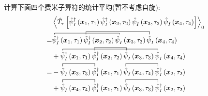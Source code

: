 \begin{example}计算下面四个费米子算符的统计平均(暂不考虑自旋):
\begin{align}
& \left\langle\hat{T}_\tau\left[\hat{\psi}_I^{\dagger}\left(\vct{x}_1, \tau_1\right) \hat{\psi}_I^{\dagger}\left(\vct{x}_2, \tau_2\right) \hat{\psi}^{}_I\left(\vct{x}_3, \tau_3\right) \hat{\psi}^{}_I\left(\vct{x}_4, \tau_4\right)\right]\right\rangle_0 \nonumber\\
= &
\contraction[0.5ex]{}{\hat{\psi}}{_I^{\dagger}\left(\vct{x}_1, \tau_1\right) \hat{\psi}_I^{\dagger}\left(\vct{x}_2, \tau_2\right)}{\hat{\psi}_I}
\contraction[1ex]{\hat{\psi}_I^{\dagger}\left(\vct{x}_1, \tau_1\right)}{\hat{\psi}}{_I^{\dagger}\left(\vct{x}_2, \tau_2\right) \hat{\psi}^{}_I\left(\vct{x}_3, \tau_3\right)}{\hat{\psi}}
\hat{\psi}_I^{\dagger}\left(\vct{x}_1, \tau_1\right) \hat{\psi}_I^{\dagger}\left(\vct{x}_2, \tau_2\right) \hat{\psi}^{}_I\left(\vct{x}_3, \tau_3\right) \hat{\psi}^{}_I\left(\vct{x}_4, \tau_4\right)\nonumber\\
&+
\contraction[0.5ex]{}{\hat{\psi}}{_I^{\dagger}\left(\vct{x}_1, \tau_1\right) \hat{\psi}_I^{\dagger}\left(\vct{x}_2, \tau_2\right) \hat{\psi}^{}_I\left(\vct{x}_3, \tau_3\right)}{\hat{\psi}}
\contraction[1ex]{\hat{\psi}_I^{\dagger}\left(\vct{x}_1, \tau_1\right) }{\hat{\psi}}{_I^{\dagger}\left(\vct{x}_2, \tau_2\right)}{\hat{\psi}}
\hat{\psi}_I^{\dagger}\left(\vct{x}_1, \tau_1\right) \hat{\psi}_I^{\dagger}\left(\vct{x}_2, \tau_2\right) \hat{\psi}^{}_I\left(\vct{x}_3, \tau_3\right) \hat{\psi}^{}_I\left(\vct{x}_4, \tau_4\right) \nonumber\\
= & -
\contraction{}{\hat{\psi}}{^{}_I\left(\vct{x}_3, \tau_3\right)}{\hat{\psi}}
\contraction{\hat{\psi}^{}_I\left(\vct{x}_3, \tau_3\right) \hat{\psi}_I^{\dagger}\left(\vct{x}_1, \tau_1\right)}{\hat{\psi}}{^{}_I\left(\vct{x}_4, \tau_4\right) }{\hat{\psi}}
\hat{\psi}^{}_I\left(\vct{x}_3, \tau_3\right) \hat{\psi}_I^{\dagger}\left(\vct{x}_1, \tau_1\right) \hat{\psi}^{}_I\left(\vct{x}_4, \tau_4\right) \hat{\psi}_I^{\dagger}\left(\vct{x}_2, \tau_2\right)\nonumber\\
&+
\contraction{}{\hat{\psi}}{^{}_I\left(\vct{x}_4, \tau_4\right)}{\hat{\psi}}
\contraction{\hat{\psi}^{}_I\left(\vct{x}_4, \tau_4\right) \hat{\psi}_I^{\dagger}\left(\vct{x}_1, \tau_1\right)}{\hat{\psi}}{^{}_I\left(\vct{x}_3, \tau_3\right) }{\hat{\psi}}
\hat{\psi}^{}_I\left(\vct{x}_4, \tau_4\right) \hat{\psi}_I^{\dagger}\left(\vct{x}_1, \tau_1\right) \hat{\psi}^{}_I\left(\vct{x}_3, \tau_3\right) \hat{\psi}_I^{\dagger}\left(\vct{x}_2, \tau_2\right) \nonumber\\

\end{align}
\end{example}
